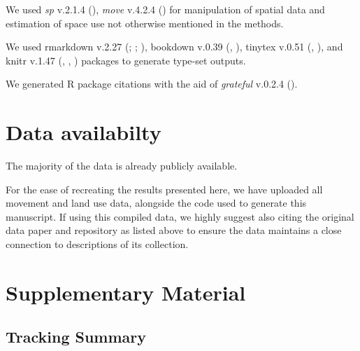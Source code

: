 \documentclass[10pt,a4paper]{article}
\begin{document}
We used \emph{sp} v.2.1.4 (), \emph{move} v.4.2.4 () for manipulation of spatial data and estimation of space use not otherwise mentioned in the methods.

We used rmarkdown v.2.27 (; ; ), bookdown v.0.39 (, ), tinytex v.0.51 (, ), and knitr v.1.47 (, , ) packages to generate type-set outputs.

We generated R package citations with the aid of \emph{grateful} v.0.2.4 ().

\section{Data availabilty}\label{data-availabilty}

The majority of the data is already publicly available.

For the ease of recreating the results presented here, we have uploaded all movement and land use data, alongside the code used to generate this manuscript.
If using this compiled data, we highly suggest also citing the original data paper and repository as listed above to ensure the data maintains a close connection to descriptions of its collection.

\section{Supplementary Material}\label{supplementary-material}

\subsection{Tracking Summary}\label{tracking-summary-1}
\end{document}
